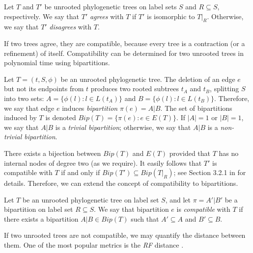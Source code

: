 \begin{definition}
\label{def:agree}
Let $T$  and $T'$ be unrooted phylogenetic trees on label sets $S$ and $R \subseteq S$, respectively. 
We say that $T'$ \emph{\glspl{agree}} with $T$ if $T'$ is isomorphic to $T|_R$. Otherwise, we say that $T'$ \emph{\glspl{disagree}} with $T$.
\end{definition}

If two trees agree, they are compatible, because every tree is a contraction (or a refinement) of itself.
Compatibility can be determined for two unrooted trees in polynomial time using bipartitions.

\begin{definition}[Bipartition]
\label{def:bipartition}
Let $T = (t, S, \phi)$ be an unrooted phylogenetic tree.
The deletion of an edge $e$ but not its endpoints from $t$ produces two \gls{rooted} subtrees $t_A$ and $t_B$, splitting $S$ into two sets: $A  = \{ \phi(l) : l \in L(t_A) \}$ and $B = \{ \phi(l) : l \in L(t_B) \}$.
Therefore, we say that edge $e$ induces \emph{\gls{bipartition}} $\pi(e) = A | B$.
The set of bipartitions induced by $T$ is denoted $Bip(T) = \{ \pi(e) : e \in E(T) \}$.
If $|A| = 1$ or $|B| = 1$, we say that $A|B$ is a \emph{trivial bipartition}; otherwise, we say that $A|B$ is a \emph{non-trivial bipartition}.
\end{definition}

There exists a bijection between $Bip(T)$ and $E(T)$ provided that $T$ has no internal nodes of degree two (as we require). 
It easily follows that $T'$ is compatible with $T$ if and only if $Bip(T') \subseteq Bip(T |_R)$; see Section 3.2.1 in \cite{warnow2017computational} for details.
Therefore, we can extend the concept of compatibility to bipartitions.


\begin{definition}
\label{def:bipartition-compatibility}
Let $T$ be an unrooted phylogenetic tree on label set $S$, and let $\pi = A'|B'$ be a bipartition on label set $R \subseteq S$. 
We say that bipartition $e$ is \emph{\gls{compatible}} with $T$ if there exists a bipartition $A|B \in Bip(T)$ such that $A' \subseteq A$ and $B' \subseteq B$.
\end{definition}

If two unrooted trees are not compatible, we may quantify the distance between them.
One of the most popular metrics is the \textit{\gls{RF}} distance \cite{robinson1981comparison}.

